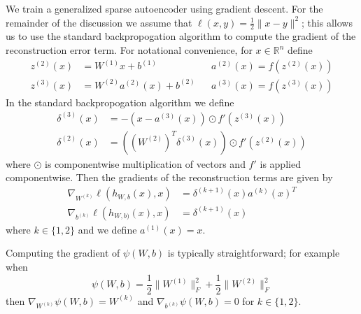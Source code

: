 \documentclass[twocolumn]{article}
\newcommand{\RR}{\mathbb{R}}
\newcommand{\Wo}{W^{(1)}}
\newcommand{\Wt}{W^{(2)}}
\newcommand{\bo}{b^{(1)}}
\newcommand{\bt}{b^{(2)}}
\newcommand{\zr}{z^{(3)}}
\newcommand{\zt}{z^{(2)}}
\newcommand{\ar}{a^{(3)}}
\newcommand{\at}{a^{(2)}}
\newcommand{\ao}{a^{(1)}}
\newcommand{\dr}{\delta^{(3)}}
\newcommand{\dt}{\delta^{(2)}}
\begin{document}
We train a generalized sparse autoencoder using gradient descent.
For the remainder of the discussion we assume that $\ell(x,y)=\frac12\|x-y\|^2$;
this allows us to use the standard backpropogation algorithm to compute
the gradient of the reconstruction error term. For notational convenience, for $x\in\RR^n$ define
\begin{align*}
  \zt(x) &=\Wo x+\bo && \at(x) = f(\zt(x)) \\
  \zr(x) &=\Wt\at(x)+\bt && \ar(x) = f(\zr(x))
\end{align*}
In the standard backpropogation algorithm we define
\begin{align*}
  \dr(x) &= -(x-\ar(x))\odot f'(\zr(x)) \\
  \dt(x) &= \left((\Wt)^T\dr(x)\right)\odot f'(\zt(x))
\end{align*}
where $\odot$ is componentwise multiplication of vectors and $f'$ is applied componentwise.
Then the gradients of the reconstruction terms are given by
\begin{align*}
  \nabla_{W^{(k)}}\ell(h_{W,b}(x),x) &= \delta^{(k+1)}(x)a^{(k)}(x)^T \\
  \nabla_{b^{(k)}}\ell(h_{W,b)}(x),x) &= \delta^{(k+1)}(x)
\end{align*}
where $k\in\{1,2\}$ and we define $\ao(x)=x$.

Computing the gradient of $\psi(W,b)$ is typically straightforward; for example when
\[\psi(W,b)=\frac12\|\Wo\|_F^2+\frac12\|\Wt\|_F^2\] then $\nabla_{W^{(k)}}\psi(W,b)=W^{(k)}$ and
$\nabla_{b^{(k)}}\psi(W,b)=0$ for $k\in\{1,2\}$.
\end{document}
